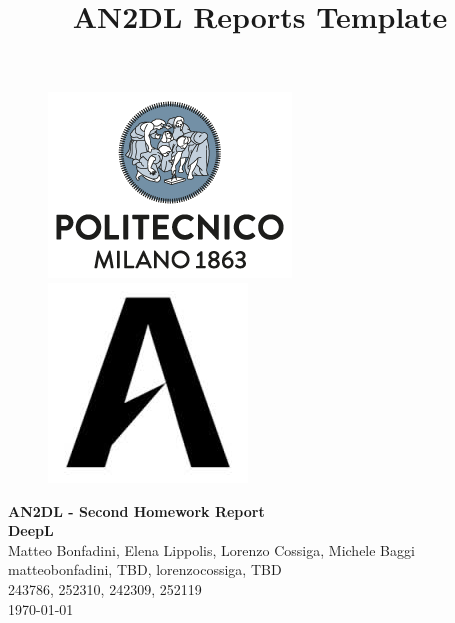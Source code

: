 \documentclass[11pt]{article}
\title{AN2DL Reports Template}
\begin{document}
    
    \begin{figure}[H]
        \raggedright
        \includegraphics[scale=0.4]{figures/polimi.png} \hfill \includegraphics[scale=0.3]{figures/airlab.jpeg}
    \end{figure}
    
    \vspace{5mm}
    
    \begin{center}
        {\Large \textbf{AN2DL - Second Homework Report}}\\
        \vspace{2mm}
        {\Large \textbf{DeepL}}\\
        \vspace{2mm}
        {\large Matteo Bonfadini,}
        {\large Elena Lippolis,}
        {\large Lorenzo Cossiga,}
        {\large Michele Baggi}\\
        \vspace{2mm}
        {matteobonfadini,}
        {TBD,}
        {lorenzocossiga,}
        {TBD}\\
        \vspace{2mm}
        {243786,}
        {252310,}
        {242309,}
        {252119}\\
        \vspace{5mm}
        \today
    \end{center}    
    \vspace{5mm}
\end{document}

